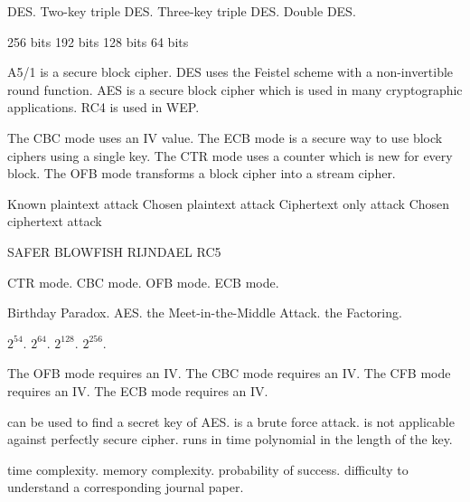 {DES.}
{Two-key triple DES.}
{Three-key triple DES.}
{Double DES.}
	
{256 bits}
{192 bits}
{128 bits}
{64 bits}

{A5/1 is a secure block cipher.}
 {DES uses the Feistel scheme with a non-invertible round function.}
 {AES is a secure block cipher which is used in many cryptographic applications.}
 {RC4 is used in WEP. }
 
{The CBC mode uses an IV value.}
{The ECB mode is a secure way to use block ciphers using a single key.}
{The CTR mode uses a counter which is new for every block.}
{The OFB mode transforms a block cipher into a stream cipher.}

{Known plaintext attack}
{Chosen plaintext attack}
{Ciphertext only attack}
{Chosen ciphertext attack}

{SAFER}
{BLOWFISH}
{RIJNDAEL}
{RC5}

{CTR mode.}
 {CBC mode.}
 {OFB mode.}
 {ECB mode.}
 

{Birthday Paradox.}
{AES.}
{the Meet-in-the-Middle Attack.}
{the Factoring.}

{$2^{54}.$}
{$2^{64}.$}
{$2^{128}.$}
{$2^{256}.$}

 {The OFB mode requires an IV.}
 {The CBC mode requires an IV.}
 {The CFB mode requires an IV.}
 {The ECB mode requires an IV.}
 
 
{can be used to find a secret key of AES.}
{is a brute force attack.}
{is not applicable against perfectly secure cipher.}
{runs in time polynomial in the length of the key.}

{time complexity.}
{memory complexity.}
{probability of success.}
{difficulty to understand a corresponding journal paper.}

